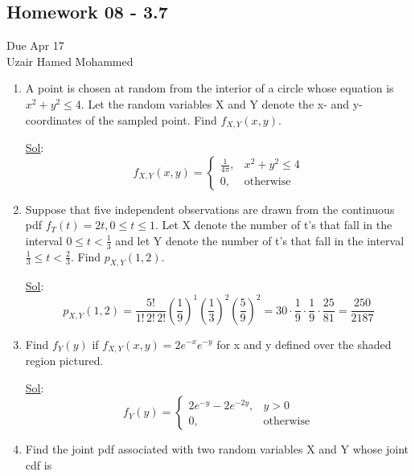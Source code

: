 \begin{center}
  \section*{Homework 08 - 3.7}
  Due Apr 17 \\
  Uzair Hamed Mohammed
\end{center}


\begin{enumerate}
  \item[12.] A point is chosen at random from the interior of a
    circle whose equation is \(x^2 + y^2 \leq 4\). Let the random
    variables X and Y denote the x- and y-coordinates of the sampled
    point. Find \(f_{X,Y} (x, y)\).

    \underline{Sol}: \\
    \[
      f_{X,Y}(x,y) =
      \begin{cases}
        \frac{1}{4\pi}, & x^2 + y^2 \le 4 \\
        0, & \text{otherwise}
      \end{cases}
    \]

  \item[14.] Suppose that five independent observations are drawn
    from the continuous pdf \(f_T(t) = 2t, 0 \leq t \leq 1\). Let X
    denote the number of t’s that fall in the interval \(0 \leq t <
    \frac{1}{3}\) and let Y denote the number of t’s that fall in the
    interval \(\frac{1}{3} \leq t < \frac{2}{3}\). Find \(p_{X,Y}(1, 2)\).

    \underline{Sol}: \\
    \[
      p_{X,Y}(1,2) =
      \frac{5!}{1!\,2!\,2!}\left(\frac{1}{9}\right)^1\left(\frac{1}{3}\right)^2\left(\frac{5}{9}\right)^2
      = 30 \cdot \frac{1}{9} \cdot \frac{1}{9} \cdot \frac{25}{81} =
      \frac{250}{2187}
    \]


  \item[22.] Find \(f_Y (y)\) if \(f_{X, Y} (x, y) = 2e^{-x} e^{-y}\)
    for x and y defined over the shaded region pictured.

    \underline{Sol}: \\
    \[
      f_Y(y) =
      \begin{cases}
        2e^{-y} - 2e^{-2y}, & y > 0 \\
        0, & \text{otherwise}
      \end{cases}
    \]

  \item[30.] Find the joint pdf associated with two random variables
    X and Y whose joint cdf is


\end{enumerate}
